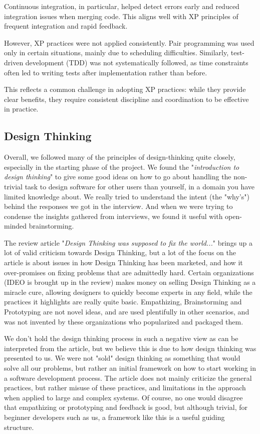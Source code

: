 Continuous integration, in particular, helped detect errors early and reduced integration issues when merging code.
This aligns well with XP principles of frequent integration and rapid feedback.

However, XP practices were not applied consistently.
Pair programming was used only in certain situations, mainly due to scheduling difficulties.
Similarly, test-driven development (TDD) was not systematically followed,
as time constraints often led to writing tests after implementation rather than before.

This reflects a common challenge in adopting XP practices:
while they provide clear benefits,
they require consistent discipline and coordination to be effective in practice.

\subsection{Design Thinking}

Overall, we followed many of the principles of design-thinking quite closely, especially in the starting phase of the project.
We found the "\textit{introduction to design thinking}"\cite{DesignThinking} to give some good ideas on how to go about handling
the non-trivial task to design software for other users than yourself, in a domain you have limited knowledge about.
We really tried to understand the intent (the "why's") behind the responses we got in the interview.
And when we were trying to condense the insights gathered from interviews, we found it useful with open-minded brainstorming.

The review article "\textit{Design Thinking was supposed to fix the world...}"\cite{fix_the_world}
brings up a lot of valid criticism towards Design Thinking, but a lot of the focus on the article is
about issues in how Design Thinking has been marketed, and how it over-promises on fixing problems that are admittedly hard.
Certain organizations (IDEO is brought up in the review) makes money on selling Design Thinking as a miracle cure, allowing designers
to quickly become experts in any field, while the practices it highlights are really quite basic.
Empathizing, Brainstorming and Prototyping are not novel ideas, and are used plentifully in other scenarios, and was not invented by these organizations who popularized and packaged them.

We don't hold the design thinking process in such a negative view as can be interpreted from the article, but we believe this is due to how design thinking was presented to us.
We were not "sold" design thinking as something that would solve all our problems, but rather an initial framework on how to start working in a software development process.
The article does not mainly criticize the general practices, but rather misuse of these practices, and limitations in the approach when applied to large and complex systems.
Of course, no one would disagree that empathizing or prototyping and feedback is good, but although trivial, for beginner developers such as us, a framework like this is a useful guiding structure.

